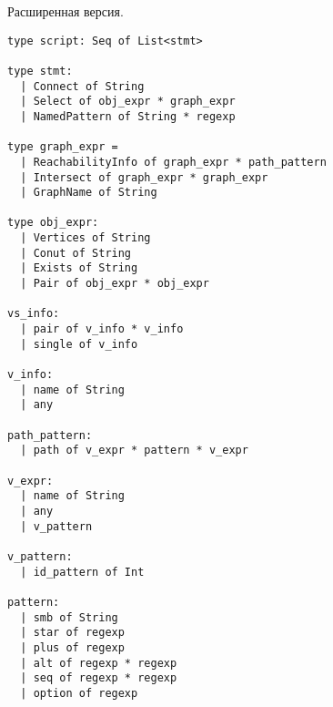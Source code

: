 Расширенная версия.

\begin{verbatim}
type script: Seq of List<stmt>

type stmt:
  | Connect of String
  | Select of obj_expr * graph_expr
  | NamedPattern of String * regexp

type graph_expr =
  | ReachabilityInfo of graph_expr * path_pattern 
  | Intersect of graph_expr * graph_expr 
  | GraphName of String

type obj_expr:
  | Vertices of String  
  | Conut of String
  | Exists of String
  | Pair of obj_expr * obj_expr

vs_info:
  | pair of v_info * v_info
  | single of v_info

v_info:
  | name of String
  | any
  
path_pattern:
  | path of v_expr * pattern * v_expr

v_expr: 
  | name of String
  | any 
  | v_pattern

v_pattern:
  | id_pattern of Int   

pattern: 
  | smb of String
  | star of regexp
  | plus of regexp
  | alt of regexp * regexp
  | seq of regexp * regexp
  | option of regexp

\end{verbatim}

